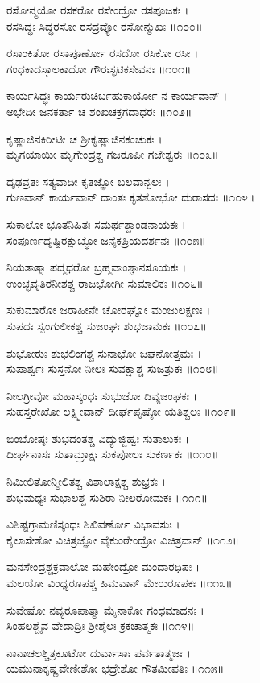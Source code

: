 ರಸೋನ್ಮಯೋ ರಸಕರೋ ರಸೇಂದ್ರೋ ರಸಪೂಜಕಃ ।\\
ರಸಸಿದ್ಧಃ ಸಿದ್ಧರಸೋ ರಸದ್ರವ್ಯೋ ರಸೋನ್ಮುಖಃ ॥೧೦೦॥

ರಸಾಂಕಿತೋ ರಸಾಪೂರ್ಣೋ ರಸದೋ ರಸಿಕೋ ರಸೀ ।\\
ಗಂಧಕಾದಸ್ತಾಲಕಾದೋ ಗೌರಃಸ್ಫಟಿಕಸೇವನಃ ॥೧೦೧॥

ಕಾರ್ಯಸಿದ್ಧಃ ಕಾರ್ಯರುಚಿರ್ಬಹುಕಾರ್ಯೋ ನ ಕಾರ್ಯವಾನ್ ।\\
ಅಭೇದೀ ಜನಕರ್ತಾ ಚ ಶಂಖಚಕ್ರಗದಾಧರಃ ॥೧೦೨॥

ಕೃಷ್ಣಾಜಿನಕಿರೀಟೀ ಚ ಶ್ರೀಕೃಷ್ಣಾಜಿನಕಂಚುಕಃ ।\\
ಮೃಗಯಾಯೀ ಮೃಗೇಂದ್ರಶ್ಚ ಗಜರೂಪೀ ಗಜೇಶ್ವರಃ ॥೧೦೩॥

ದೃಢವ್ರತಃ ಸತ್ಯವಾದೀ ಕೃತಜ್ಞೋ ಬಲವಾನ್ಬಲಃ ।\\
ಗುಣವಾನ್ ಕಾರ್ಯವಾನ್ ದಾಂತಃ ಕೃತಶೋಭೋ ದುರಾಸದಃ ॥೧೦೪॥

ಸುಕಾಲೋ ಭೂತನಿಹಿತಃ ಸಮರ್ಥಶ್ಚಾಂಡನಾಯಕಃ ।\\
ಸಂಪೂರ್ಣದೃಷ್ಟಿರಕ್ಷುಬ್ಧೋ ಜನೈಕಪ್ರಿಯದರ್ಶನಃ ॥೧೦೫॥

ನಿಯತಾತ್ಮಾ ಪದ್ಮಧರೋ ಬ್ರಹ್ಮವಾಂಶ್ಚಾನಸೂಯಕಃ ।\\
ಉಂಚ್ಛವೃತಿರನೀಶಶ್ಚ ರಾಜಭೋಗೀ ಸುಮಾಲಿಕಃ ॥೧೦೬॥

ಸುಕುಮಾರೋ ಜರಾಹೀನೇ ಚೋರಘ್ನೋ ಮಂಜುಲಕ್ಷಣಃ ।\\
ಸುಪದಃ ಸ್ವಂಗುಲೀಕಶ್ಚ ಸುಜಂಘಃ ಶುಭಜಾನುಕಃ ॥೧೦೭॥

ಶುಭೋರುಃ ಶುಭಲಿಂಗಶ್ಚ ಸುನಾಭೋ ಜಘನೋತ್ತಮಃ ।\\
ಸುಪಾರ್ಶ್ವಃ ಸುಸ್ತನೋ ನೀಲಃ ಸುವಕ್ಷಾಶ್ಚ ಸುಜತ್ರುಕಃ ॥೧೦೮॥

ನೀಲಗ್ರೀವೋ ಮಹಾಸ್ಕಂಧಃ ಸುಭುಜೋ ದಿವ್ಯಜಂಘಕಃ ।\\
ಸುಹಸ್ತರೇಖೋ ಲಕ್ಷ್ಮೀವಾನ್ ದೀರ್ಘಪೃಷ್ಠೋ ಯತಿಶ್ಚಲಃ ॥೧೦೯॥

ಬಿಂಬೋಷ್ಠಃ ಶುಭದಂತಶ್ಚ ವಿದ್ಯುಜ್ಜಿಹ್ವಃ ಸುತಾಲುಕಃ ।\\
ದೀರ್ಘನಾಸಃ ಸುತಾಮ್ರಾಕ್ಷಃ ಸುಕಪೋಲಃ ಸುಕರ್ಣಕಃ ॥೧೧೦॥

ನಿಮೀಲಿತೋನ್ಮೀಲಿತಶ್ಚ ವಿಶಾಲಾಕ್ಷಶ್ಚ ಶುಭ್ರಕಃ ।\\
ಶುಭಮಧ್ಯಃ ಸುಭಾಲಶ್ಚ ಸುಶಿರಾ ನೀಲರೋಮಕಃ ॥೧೧೧॥

ವಿಶಿಷ್ಟಗ್ರಾಮಣಿಸ್ಕಂಧಃ ಶಿಖಿವರ್ಣೋ ವಿಭಾವಸುಃ ।\\
ಕೈಲಾಸೇಶೋ ವಿಚಿತ್ರಜ್ಞೋ ವೈಕುಂಠೇಂದ್ರೋ ವಿಚಿತ್ರವಾನ್ ॥೧೧೨॥

ಮನಸೇಂದ್ರಶ್ಚಕ್ರವಾಲೋ ಮಹೇಂದ್ರೋ ಮಂದಾರಧಿಪಃ ।\\
ಮಲಯೋ ವಿಂಧ್ಯರೂಪಶ್ಚ ಹಿಮವಾನ್ ಮೇರುರೂಪಕಃ ॥೧೧೩॥

ಸುವೇಷೋ ನವ್ಯರೂಪಾತ್ಮಾ ಮೈನಾಕೋ ಗಂಧಮಾದನಃ ।\\
ಸಿಂಹಲಶ್ಚೈವ ವೇದಾದ್ರಿಃ ಶ್ರೀಶೈಲಃ ಕ್ರಕಚಾತ್ಮಕಃ ॥೧೧೪॥

ನಾನಾಚಲಶ್ಚಿತ್ರಕೂಟೋ ದುರ್ವಾಸಾಃ ಪರ್ವತಾತ್ಮಜಃ ।\\
ಯಮುನಾಕೃಷ್ಣವೇಣೀಶೋ ಭದ್ರೇಶೋ ಗೌತಮೀಪತಿಃ ॥೧೧೫॥

